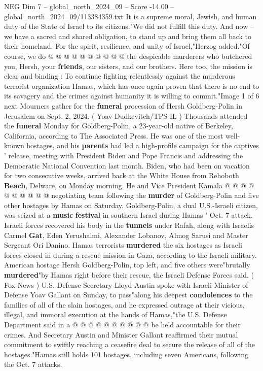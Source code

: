 \begin{textsample}{NEG Dim 7 – global\_north\_2024\_09 – Score -14.00 – global\_north\_2024\_09/113384359.txt}
It is a supreme moral, Jewish, and human duty of the State of Israel to its citizens."We did not fulfill this duty.
And now -- we have a sacred and shared obligation, to stand up and bring them all back to their homeland.
For the spirit, resilience, and unity of Israel,"Herzog added."Of course, we do @ @ @ @ @ @ @ @ @ @ the despicable murderers who butchered you, Hersh, your \textbf{friends}, our sisters, and our brothers.
Here too, the mission is clear and binding : To continue fighting relentlessly against the murderous terrorist organization Hamas, which has once again proven that there is no end to its savagery and the crimes against humanity it is willing to commit."Image 1 of 6 next Mourners gather for the \textbf{funeral} procession of Hersh Goldberg-Polin in Jerusalem on Sept. 2, 2024. ( Yoav Dudkevitch/TPS-IL ) Thousands attended the \textbf{funeral} Monday for Goldberg-Polin, a 23-year-old native of Berkeley, California, according to The Associated Press.
He was one of the most well-known hostages, and his \textbf{parents} had led a high-profile campaign for the captives ' release, meeting with President Biden and Pope Francis and addressing the Democratic National Convention last month.
Biden, who had been on vacation for two consecutive weeks, arrived back at the White House from Rehoboth \textbf{Beach}, Delware, on Monday morning.
He and Vice President Kamala @ @ @ @ @ @ @ @ @ @ negotiating team following the \textbf{murder} of Goldberg-Polin and five other hostages by Hamas on Saturday.
Goldberg-Polin, a dual U.S.-Israeli citizen, was seized at a \textbf{music} \textbf{festival} in southern Israel during Hamas ' Oct. 7 attack.
Israeli forces recovered his body in the \textbf{tunnels} under Rafah, along with Israelis Carmel \textbf{Gat}, Eden Yerushalmi, Alexander Lobanov, Almog Sarusi and Master Sergeant Ori Danino.
Hamas terrorists \textbf{murdered} the six hostages as Israeli forces closed in during a rescue mission in Gaza, according to the Israeli military.
American hostage Hersh Goldberg-Polin, top left, and five others were"brutally \textbf{murdered}"by Hamas right before their rescue, the Israeli Defense Forces said. ( Fox News ) U.S.
Defense Secretary Lloyd Austin spoke with Israeli Minister of Defense Yoav Gallant on Sunday, to pass"along his deepest \textbf{condolences} to the families of all of the slain hostages, and he expressed outrage at their vicious, illegal, and immoral execution at the hands of Hamas,"the U.S.
Defense Department said in a @ @ @ @ @ @ @ @ @ @ be held accountable for their crimes.
And Secretary Austin and Minister Gallant reaffirmed their mutual commitment to swiftly reaching a ceasefire deal to secure the release of all of the hostages."Hamas still holds 101 hostages, including seven Americans, following the Oct. 7 attacks.

\end{textsample}
